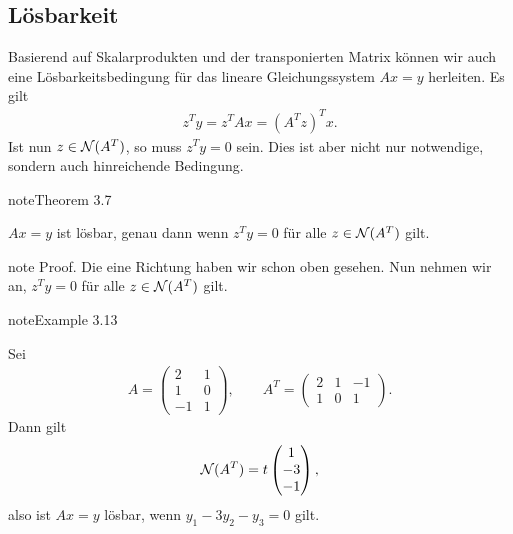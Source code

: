 \documentclass[letterpaper,10pt,english]{jupyterBook}
\begin{document}
\subsection{Lösbarkeit}
\label{\detokenize{vektorraeume/LGS:losbarkeit}}
Basierend auf Skalarprodukten und der transponierten Matrix können wir auch eine Lösbarkeitsbedingung für das lineare Gleichungssystem \(A x = y\) herleiten. Es gilt
\begin{equation*}
\begin{split} z^T y = z^T A x = (A^T z)^T x.\end{split}
\end{equation*}
Ist nun \(z \in {\cal N}(A^T)\), so muss \(z^T y = 0\) sein. Dies ist aber nicht nur notwendige, sondern auch hinreichende Bedingung.
\label{vektorraeume/LGS:theorem-6}
\begin{sphinxadmonition}{note}{Theorem 3.7}



\(Ax=y\) ist lösbar, genau dann wenn \(z^T y = 0\) für alle \(z \in {\cal N}(A^T)\) gilt.
\end{sphinxadmonition}

\begin{sphinxadmonition}{note}
Proof.  Die eine Richtung haben wir schon oben gesehen. Nun nehmen wir an, \(z^T y = 0\) für alle \(z \in {\cal N}(A^T)\) gilt.
\end{sphinxadmonition}
\label{vektorraeume/LGS:example-7}
\begin{sphinxadmonition}{note}{Example 3.13}



Sei
\begin{equation*}
\begin{split}A = \left(  \begin{matrix} 2 & 1 \\ 1  & 0 \\ -1 & 1\end{matrix} \right), \qquad A^T = \left(  \begin{matrix}
2 & 1 & -1 \\ 1 & 0 & 1 \end{matrix} \right).\end{split}
\end{equation*}
Dann gilt
\begin{equation*}
\begin{split} {\cal N}(A^T) = t \begin{pmatrix} 1 \\ - 3 \\ -1\end{pmatrix},\end{split}
\end{equation*}
also ist \(Ax =y\) lösbar, wenn \(y_1 - 3y_2 -y_3 = 0\) gilt.
\end{sphinxadmonition}
\end{document}
